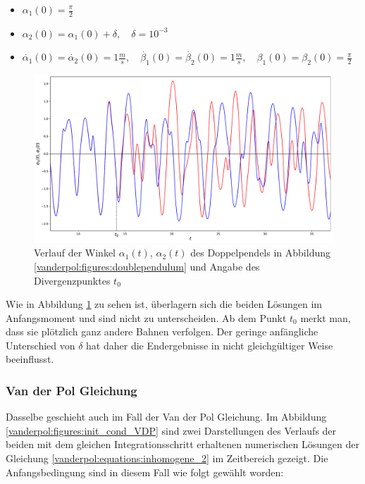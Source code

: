 \begin{itemize}
\item
$\alpha_1(0) = \frac{\pi}{2}$
\item
$\alpha_2(0) = \alpha_1(0) + \delta, \quad \delta = 10^{-3}$
\item
$\dot{\alpha_1}(0) = \dot{\alpha_2}(0)= 1 \frac{m}{s}, \quad \dot{\beta_1}(0) = \dot{\beta_2}(0)= 1 \frac{m}{s}, \quad \beta_1(0)=\beta_2(0)=\displaystyle\frac{\pi}{2}$
\end{itemize}

\begin{figure}
\includegraphics[width=\textwidth]{papers/vanderpol/figures/initial_cond_DBLPEND.pdf}
\caption{Verlauf der Winkel $\alpha_1(t)$, $\alpha_2(t)$ des Doppelpendels in Abbildung \ref{vanderpol:figures:doublependulum} und Angabe des Divergenzpunktes $t_0$\label{vanderpol:figures:init_cond_dbl_pend}}
\end{figure}
\noindent Wie in Abbildung \ref{vanderpol:figures:init_cond_dbl_pend} zu sehen ist, überlagern sich die beiden Lösungen im Anfangsmoment und sind nicht zu unterscheiden. Ab dem Punkt $t_0$ merkt man, dass sie plötzlich ganz andere Bahnen verfolgen. Der geringe anfängliche Unterschied von $\delta$ hat daher die Endergebnisse in nicht gleichgültiger Weise beeinflusst.
\subsubsection{Van der Pol Gleichung}
\label{vanderpol:subsubsection:vdp}
Dasselbe geschieht auch im Fall der Van der Pol Gleichung. Im  Abbildung \ref{vanderpol:figures:init_cond_VDP} sind zwei Darstellungen des Verlaufs der beiden mit dem gleichen Integrationsschritt erhaltenen numerischen Lösungen der Gleichung \eqref{vanderpol:equations:inhomogene_2} im Zeitbereich gezeigt. Die Anfangsbedingung sind in diesem Fall wie folgt gewählt worden:


